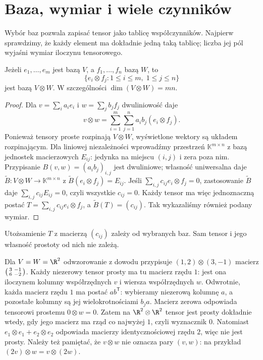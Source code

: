 \section{Baza, wymiar i wiele czynników}
\label{sec:baza-tensorowa}

Wybór baz pozwala zapisać tensor jako tablicę współczynników.
Najpierw sprawdzimy, że każdy element ma dokładnie jedną taką tablicę;
liczba jej pól wyjaśni wymiar iloczynu tensorowego.

\begin{twierdzenie}
\label{thm:baza-tensorowa}
Jeżeli $e_1,\ldots,e_m$ jest bazą $V$, a
$f_1,\ldots,f_n$ bazą $W$, to
\[
 \bigl\{e_i\otimes f_j:1\leq i\leq m,\;1\leq j\leq n\bigr\}
\]
jest bazą $V\otimes W$. W szczególności
$\dim(V\otimes W)=mn$.
\end{twierdzenie}
\begin{proof}
Dla $v=\sum_i a_i e_i$ i $w=\sum_j b_j f_j$ dwuliniowość daje
\[
 v\otimes w=\sum_{i=1}^m\sum_{j=1}^n a_ib_j(e_i\otimes f_j).
\]
Ponieważ tensory proste rozpinają $V\otimes W$, wyświetlone
wektory są układem rozpinającym. Dla liniowej niezależności
wprowadźmy przestrzeń $\mathbb K^{m\times n}$ z bazą jednostek
macierzowych $E_{ij}$: jedynka na miejscu $(i,j)$ i zera poza nim. Przypisanie
$B(v,w)=(a_i b_j)_{i,j}$ jest dwuliniowe; własność uniwersalna
daje $\widetilde B\colon V\otimes W\to\mathbb K^{m\times n}$
z $\widetilde B(e_i\otimes f_j)=E_{ij}$. Jeśli
$\sum_{i,j}c_{ij}e_i\otimes f_j=0$, zastosowanie
$\widetilde B$ daje $\sum_{i,j}c_{ij}E_{ij}=0$, czyli
wszystkie $c_{ij}=0$. Każdy tensor ma więc jednoznaczną postać
$T=\sum_{i,j}c_{ij}e_i\otimes f_j$, a $\widetilde B(T)=(c_{ij})$.
Tak wykazaliśmy również podany wymiar.
\end{proof}

Utożsamienie $T$ z macierzą $(c_{ij})$ zależy od wybranych baz.
Sam tensor i jego własność prostoty od nich nie zależą.

\begin{przyklad}
Dla $V=W=\R^2$ odwzorowanie z dowodu przypisuje
$(1,2)\otimes(3,-1)$ macierz
$\begin{psmallmatrix}3&-1\\6&-2\end{psmallmatrix}$.
Każdy niezerowy tensor prosty ma tu macierz rzędu $1$:
jest ona iloczynem kolumny współrzędnych $v$ i wiersza
współrzędnych $w$. Odwrotnie, każda macierz rzędu $1$
ma postać $ab^{\mathsf T}$: wybieramy niezerową kolumnę $a$,
a pozostałe kolumny są jej wielokrotnościami $b_j a$.
Macierz zerowa odpowiada tensorowi prostemu $0\otimes w=0$.
Zatem na $\R^2\otimes\R^2$ tensor jest prosty dokładnie wtedy,
gdy jego macierz ma rząd co najwyżej $1$, czyli wyznacznik $0$.
Natomiast
$e_1\otimes e_1+e_2\otimes e_2$ odpowiada macierzy
identycznościowej rzędu $2$, więc nie jest prosty.
Należy też pamiętać, że $v\otimes w$ nie oznacza pary $(v,w)$:
na przykład $(2v)\otimes w=v\otimes(2w)$.
\end{przyklad}


